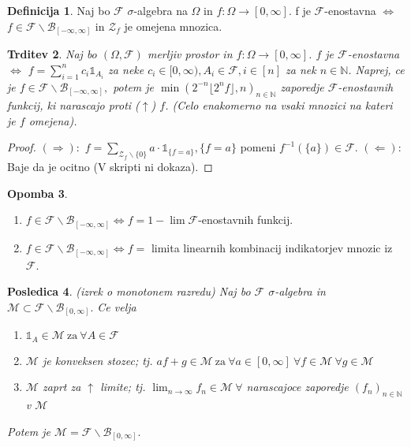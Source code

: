 \documentclass[a4paper,12pt]{article}
\theoremstyle{definition} %
\newtheorem{definicija}{Definicija}[section]
\newtheorem{opomba}[definicija]{Opomba}
\theoremstyle{plain} %
\newtheorem{trditev}[definicija]{Trditev}
\newtheorem{posledica}[definicija]{Posledica}
\newcommand{\N}{\mathbb{N}}
\newcommand{\F}{\mathcal{F}}
\begin{document}
            \begin{definicija}
                Naj bo $\F$ $\sigma$-algebra na $\Omega$ in $f:\Omega\rightarrow [0, \infty]$.
                f je $\F$-enostavna $\iff$ $f \in \F\backslash\mathcal{B}_{[-\infty, \infty]}$ in $\mathcal{Z}_f$ je omejena mnozica.
            \end{definicija}

            \begin{trditev}
                Naj bo $(\Omega, \F)$ merljiv prostor in $f:\Omega\rightarrow [0, \infty]$. $f$ je $\F$-enostavna $\iff$
                $f = \sum_{i = 1}^{n}c_i\mathds{1}_{A_i}$ za neke $c_i \in [0, \infty), A_i \in \F, i \in [n]$ za nek $n \in \N$. Naprej, ce je $f \in \F\backslash\mathcal{B}_{[-\infty, \infty]},$
                potem je $\min\left(2^{-n}\lfloor2^nf\rfloor, n\right)_{n \in \N}$ zaporedje $\F$-enostavnih funkcij, ki narascajo proti ($\uparrow$) $f$. (Celo enakomerno na vsaki mnozici na kateri je $f$ omejena).
            \end{trditev}

            \begin{proof}
                $(\Rightarrow):$ $f = \sum_{\mathcal{Z}_f\backslash\{0\}}a\cdot\mathds{1}_{\{f = a\}}, \{f = a\}$ pomeni $f^{-1}(\{a\}) \in \F.$
                $(\Leftarrow):$ Baje da je ocitno (V skripti ni dokaza).
            \end{proof}

            \begin{opomba}
                \begin{enumerate}
                    \item $f \in \F\backslash\mathcal{B}_{[-\infty, \infty]} \iff f = 1 - \lim\F$-enostavnih funkcij.
                    \item $f \in \F\backslash\mathcal{B}_{[-\infty, \infty]} \iff f =$ limita linearnih kombinacij indikatorjev mnozic iz $\F$.
                \end{enumerate}

            \end{opomba}

            \begin{posledica}(izrek o monotonem razredu)
                Naj bo $\F$ $\sigma$-algebra in $\mathcal{M} \subset \F\backslash\mathcal{B}_{[0, \infty]}.$ Ce velja
                \begin{enumerate}
                    \item $\mathds{1}_A \in \mathcal{M} \ \text{za} \ \forall A \in \F$
                    \item $\mathcal{M}$ je konveksen stozec; tj. $af + g \in \mathcal{M} \ \text{za} \ \forall a \in [0, \infty] \ \forall f \in \mathcal{M} \ \forall g \in \mathcal{M}$
                    \item $\mathcal{M}$ zaprt za $\uparrow$ limite; tj. $\lim_{n \rightarrow \infty}f_n \in \mathcal{M} \ \forall$ narascajoce zaporedje $(f_n)_{n \in \N} $ v $\mathcal{M}$
                \end{enumerate}
                Potem je $\mathcal{M} =  \F\backslash\mathcal{B}_{[0, \infty]}.$
            \end{posledica}
\end{document}
